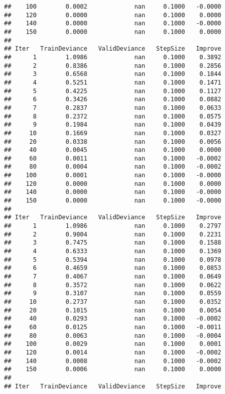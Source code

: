 \documentclass[
]{article}
\begin{document}
\begin{verbatim}
##    100        0.0002             nan     0.1000   -0.0000
##    120        0.0000             nan     0.1000    0.0000
##    140        0.0000             nan     0.1000   -0.0000
##    150        0.0000             nan     0.1000    0.0000
## 
## Iter   TrainDeviance   ValidDeviance   StepSize   Improve
##      1        1.0986             nan     0.1000    0.3892
##      2        0.8386             nan     0.1000    0.2856
##      3        0.6568             nan     0.1000    0.1844
##      4        0.5251             nan     0.1000    0.1471
##      5        0.4225             nan     0.1000    0.1127
##      6        0.3426             nan     0.1000    0.0882
##      7        0.2837             nan     0.1000    0.0633
##      8        0.2372             nan     0.1000    0.0575
##      9        0.1984             nan     0.1000    0.0439
##     10        0.1669             nan     0.1000    0.0327
##     20        0.0338             nan     0.1000    0.0056
##     40        0.0045             nan     0.1000    0.0000
##     60        0.0011             nan     0.1000   -0.0002
##     80        0.0004             nan     0.1000   -0.0002
##    100        0.0001             nan     0.1000   -0.0000
##    120        0.0000             nan     0.1000    0.0000
##    140        0.0000             nan     0.1000   -0.0000
##    150        0.0000             nan     0.1000   -0.0000
## 
## Iter   TrainDeviance   ValidDeviance   StepSize   Improve
##      1        1.0986             nan     0.1000    0.2797
##      2        0.9004             nan     0.1000    0.2231
##      3        0.7475             nan     0.1000    0.1588
##      4        0.6333             nan     0.1000    0.1369
##      5        0.5394             nan     0.1000    0.0978
##      6        0.4659             nan     0.1000    0.0853
##      7        0.4067             nan     0.1000    0.0649
##      8        0.3572             nan     0.1000    0.0622
##      9        0.3107             nan     0.1000    0.0559
##     10        0.2737             nan     0.1000    0.0352
##     20        0.1015             nan     0.1000    0.0054
##     40        0.0293             nan     0.1000   -0.0002
##     60        0.0125             nan     0.1000   -0.0011
##     80        0.0063             nan     0.1000   -0.0004
##    100        0.0029             nan     0.1000    0.0001
##    120        0.0014             nan     0.1000   -0.0002
##    140        0.0008             nan     0.1000   -0.0002
##    150        0.0006             nan     0.1000    0.0000
## 
## Iter   TrainDeviance   ValidDeviance   StepSize   Improve

\end{verbatim}
\end{document}
